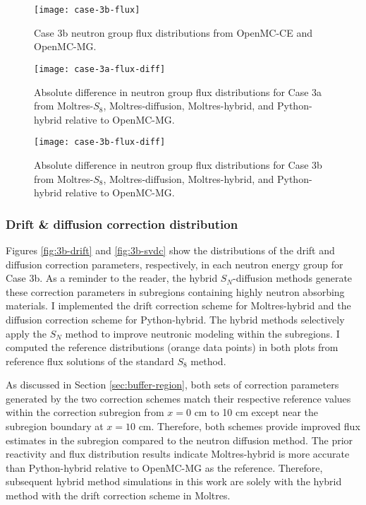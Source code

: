 \begin{figure}[p]
  \centering
  \texttt{[image: case-3b-flux]}
  \caption{Case 3b neutron group flux distributions from OpenMC-CE and OpenMC-MG.}
  \label{fig:3b-flux}
\end{figure}

\begin{figure}[p]
  \centering
  \texttt{[image: case-3a-flux-diff]}
  \caption{Absolute difference in neutron group flux distributions for Case 3a from Moltres-$S_8$,
  Moltres-diffusion, Moltres-hybrid, and Python-hybrid relative to OpenMC-MG.}
  \label{fig:3a-flux-diff}
\end{figure}

\begin{figure}[p]
  \centering
  \texttt{[image: case-3b-flux-diff]}
  \caption{Absolute difference in neutron group flux distributions for Case 3b from Moltres-$S_8$,
  Moltres-diffusion, Moltres-hybrid, and Python-hybrid relative to OpenMC-MG.}
  \label{fig:3b-flux-diff}
\end{figure}

\FloatBarrier

\subsubsection{Drift \& diffusion correction distribution}

Figures \ref{fig:3b-drift} and \ref{fig:3b-svdc} show the distributions of the drift and diffusion
correction parameters, respectively, in each neutron energy group for Case 3b. As a reminder to the
reader, the hybrid $S_N$-diffusion methods generate these correction parameters in subregions
containing highly neutron absorbing materials. I implemented the drift correction scheme for
Moltres-hybrid and the diffusion correction scheme for Python-hybrid. The hybrid methods
selectively apply the $S_N$ method to improve neutronic modeling within the subregions. I computed
the reference distributions (orange data points) in both plots from reference flux solutions of the
standard $S_8$ method.

As discussed in Section \ref{sec:buffer-region}, both sets of correction parameters generated by
the two correction schemes match their respective reference values within the correction subregion
from $x=0$ cm to 10 cm except near the subregion boundary at $x=10$ cm. Therefore, both schemes
provide improved flux estimates in the subregion compared to the neutron diffusion method.
The prior reactivity and flux distribution results indicate Moltres-hybrid is more accurate
than Python-hybrid relative to OpenMC-MG as the reference. Therefore, subsequent hybrid method
simulations in this work are solely with the hybrid method with the drift correction scheme in
Moltres.

